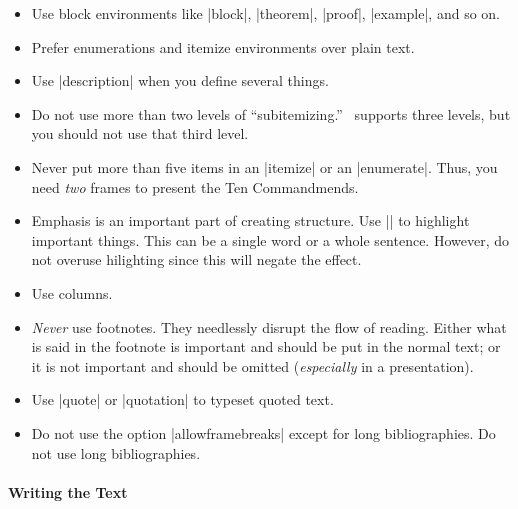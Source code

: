\begin{itemize}
\item
  Use block environments like |block|, |theorem|, |proof|, |example|,
  and so on.
\item
  Prefer enumerations and itemize environments over plain text.
\item
  Use |description| when you define several things.
\item
  Do not use more than two levels of ``subitemizing.'' \beamer\
  supports three levels, but you should not use that third level.
\item
  Never put more than five items in an |itemize| or an
  |enumerate|. Thus, you need \emph{two} frames to present the Ten
  Commandmends.
\item
  Emphasis is an important part of creating structure. Use |\alert| to
  highlight important things. This can be a single word or a whole
  sentence. However, do not overuse hilighting since this will negate
  the effect.
\item
  Use columns.
\item
  \emph{Never} use footnotes. They needlessly disrupt the flow of
  reading. Either what is said in the footnote is important and should
  be put in the normal text; or it is not important and should be
  omitted (\emph{especially} in a presentation).
\item
  Use |quote| or |quotation| to typeset quoted text.
\item
  Do not use the option |allowframebreaks| except for long
  bibliographies. Do not use long bibliographies.
\end{itemize}




\paragraph{Writing the Text}


